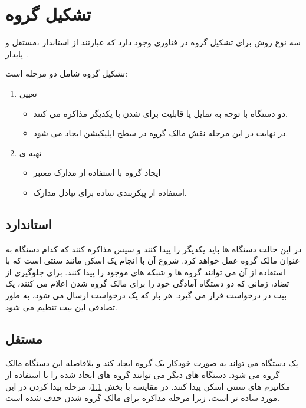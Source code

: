 \section{تشکیل گروه}
سه نوع روش برای تشکیل گروه در فناوری
وجود دارد که عبارتند از استاندار
،مستقل
و پایدار
.

تشکیل گروه شامل دو مرحله است:
\begin{enumerate}
	\item تعیین 
	\begin{itemize}
		\item  دو دستگاه با توجه به تمایل یا قابلیت برای  شدن با یکدیگر مذاکره می کنند.
		\item در نهایت در این مرحله نقش مالک گروه در سطح اپلیکیشن ایجاد می شود. 
	\end{itemize}
	\item تهیه ی 
	\begin{itemize}
		\item ایجاد  گروه با استفاده از مدارک معتبر
		\item استفاده از پیکربندی ساده  برای تبادل مدارک.
	\end{itemize}
\end{enumerate}

\subsection{استاندارد}\label{subsec:Standard}
در این حالت دستگاه ها باید یکدیگر را پیدا 
کنند و سپس مذاکره کنند که کدام دستگاه به عنوان  مالک گروه عمل خواهد کرد. شروع آن با انجام یک اسکن مانند 
 سنتی است که با استفاده از آن می توانند گروه ها و شبکه های
  موجود را پیدا کنند. برای جلوگیری از تضاد، زمانی که دو دستگاه آمادگی خود را برای مالک گروه شدن اعلام می کنند، یک بیت 
   در درخواست قرار می گیرد. هر بار که یک درخواست ارسال می شود، به طور تصادفی این بیت تنظیم می شود.
\subsection{مستقل}
یک دستگاه می تواند به صورت خودکار یک گروه  ایجاد کند و بلافاصله این دستگاه مالک گروه می شود. دستگاه های دیگر می توانند گروه های ایجاد شده را با استفاده از مکانیزم های سنتی اسکن پیدا کنند. در مقایسه با بخش \ref{subsec:Standard}، مرحله پیدا کردن در این مورد ساده تر است، زیرا مرحله مذاکره برای مالک گروه شدن حذف شده است.
